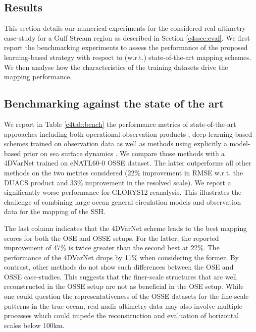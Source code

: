 \begin{bibunit}
\section{Results}
\label{c4sec:results}

This section details our numerical experiments for the considered real altimetry case-study for a Gulf Stream region as described in Section \ref{c4ssec:eval}. We first report the benchmarking experiments to assess the performance of the proposed learning-based strategy with respect to (w.r.t.) state-of-the-art mapping schemes. We then analyse how the characteristics of the training datasets drive the mapping performance. 

\subsection{Benchmarking against the state of the art}
\label{c4ssec:benchmarks}

We report in Table \ref{c4tab:bench} the performance metrics of state-of-the-art approaches including both operational observation products \cite{taburetDUACSDT2018252019,ubelmannReconstructingOceanSurface2021}, deep-learning-based schemes trained on observation data \cite{archambaultMultimodalUnsupervisedSpatioTemporal2023,martinSynthesizingSeaSurface2023} as well as methods using explicitly a model-based prior on sea surface dynamics \cite{guillouMappingAltimetryForthcoming2021,ballarottaDynamicMappingAlongTrack2020,jean-michelCopernicusGlobal122021}. We compare those methods with a 4DVarNet trained on eNATL60-0 OSSE dataset. The latter outperforms all other methods on the two metrics considered (22\% improvement in RMSE w.r.t. the DUACS product and 33\% improvement in the resolved scale). We report a significantly worse performance for GLORYS12 reanalysis. This illustrates the challenge of combining large ocean general circulation models and observation data for the mapping of the SSH.


The last column indicates that the 4DVarNet scheme leads to the best mapping scores for both the OSE and OSSE setups. For the latter, the reported improvement of 47\% is twice greater than the second best at 22\%. The performance of the 4DVarNet drops by 11\% when considering the former. By contrast, other methods do not show such differences between the OSE and OSSE case-studies. This suggests that the finer-scale structures that are well reconstructed in the OSSE setup are not as beneficial in the OSE setup. While one could question the representativeness of the OSSE datasets for the fine-scale patterns in the true ocean, real nadir altimetry data may also involve multiple processes which could impede the reconstruction and evaluation of horizontal scales below 100km.  




\end{bibunit}
